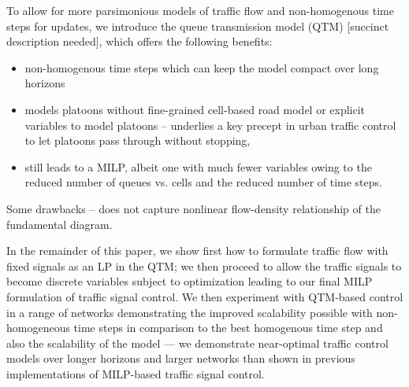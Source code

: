 To allow for more parsimonious models of traffic flow and non-homogenous
time steps for updates, we introduce the queue transmission model (QTM) [succinct description needed], which offers the following
benefits:
\begin{itemize}
\item non-homogenous time steps which can keep the model compact over long horizons
\item models platoons without fine-grained cell-based road model or explicit variables to model platoons -- underlies a key precept in urban traffic control to let platoons pass through without stopping,
\item still leads to a MILP, albeit one with much fewer variables owing to the reduced number of queues vs. cells and the reduced number of time steps.
\end{itemize}
Some drawbacks -- does not capture nonlinear flow-density relationship of the
fundamental diagram.  

In the remainder of this paper, we show first how to formulate traffic flow
with fixed signals as an LP in the QTM; we then proceed to allow the
traffic signals to become discrete variables subject to optimization leading
to our final MILP formulation of traffic signal control.  We then experiment
with QTM-based control in a range of networks demonstrating the improved
scalability possible with non-homogeneous time steps in comparison to
the best homogenous time step and also the scalability of the model ---
we demonstrate near-optimal traffic control models over longer horizons and
larger networks than shown in previous implementations of MILP-based
traffic signal control.


